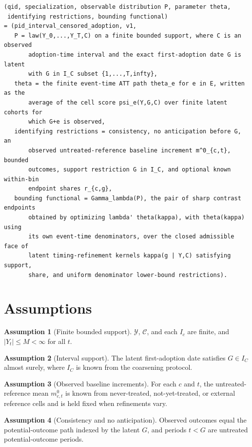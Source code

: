 \documentclass[11pt]{article}
\theoremstyle{definition}
\newtheorem{assumption}{Assumption}
\theoremstyle{plain}
\theoremstyle{remark}
\begin{document}
\begin{verbatim}
(qid, specialization, observable distribution P, parameter theta,
 identifying restrictions, bounding functional)
= (pid_interval_censored_adoption, v1,
   P = law(Y_0,...,Y_T,C) on a finite bounded support, where C is an observed
       adoption-time interval and the exact first-adoption date G is latent
       with G in I_C subset {1,...,T,infty},
   theta = the finite event-time ATT path theta_e for e in E, written as the
       average of the cell score psi_e(Y,G,C) over finite latent cohorts for
       which G+e is observed,
   identifying restrictions = consistency, no anticipation before G, an
       observed untreated-reference baseline increment m^0_{c,t}, bounded
       outcomes, support restriction G in I_C, and optional known within-bin
       endpoint shares r_{c,g},
   bounding functional = Gamma_lambda(P), the pair of sharp contrast endpoints
       obtained by optimizing lambda' theta(kappa), with theta(kappa) using
       its own event-time denominators, over the closed admissible face of
       latent timing-refinement kernels kappa(g | Y,C) satisfying support,
       share, and uniform denominator lower-bound restrictions).
\end{verbatim}

\section{Assumptions}
\begin{assumption}[Finite bounded support]\label{ass:finite}
\(\mathcal Y\), \(\mathcal C\), and each \(I_c\) are finite, and \(|Y_t|\le M<\infty\) for all \(t\).
\end{assumption}

\begin{assumption}[Interval support]\label{ass:interval}
The latent first-adoption date satisfies \(G\in I_C\) almost surely, where \(I_C\) is known from the coarsening protocol.
\end{assumption}

\begin{assumption}[Observed baseline increments]\label{ass:baseline}
For each \(c\) and \(t\), the untreated-reference mean \(m^0_{c,t}\) is known from never-treated, not-yet-treated, or external reference cells and is held fixed when refinements vary.
\end{assumption}

\begin{assumption}[Consistency and no anticipation]\label{ass:consistency}
Observed outcomes equal the potential-outcome path indexed by the latent \(G\), and periods \(t<G\) are untreated potential-outcome periods.
\end{assumption}
\end{document}
